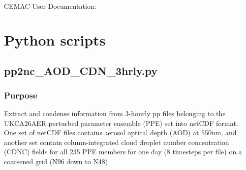 \documentclass[10pt,a4paper]{article}
\begin{document}
\begin{center}
\vspace*{0.5cm}
{\Huge CEMAC User Documentation: \Project}
\end{center}
\vspace*{0.5cm}

\section{Python scripts}

\subsection{pp2nc\_AOD\_CDN\_3hrly.py}

\subsubsection{Purpose}

Extract and condense information from 3-hourly pp files belonging to the UKCA26AER perturbed parameter ensemble (PPE) set into netCDF format. One set of netCDF files contains aerosol optical depth (AOD) at 550nm, and another set contain column-integrated cloud droplet number concentration (CDNC) fields for all 235 PPE members for one day (8 timesteps per file) on a coarsened grid (N96 down to N48)
\end{document}
